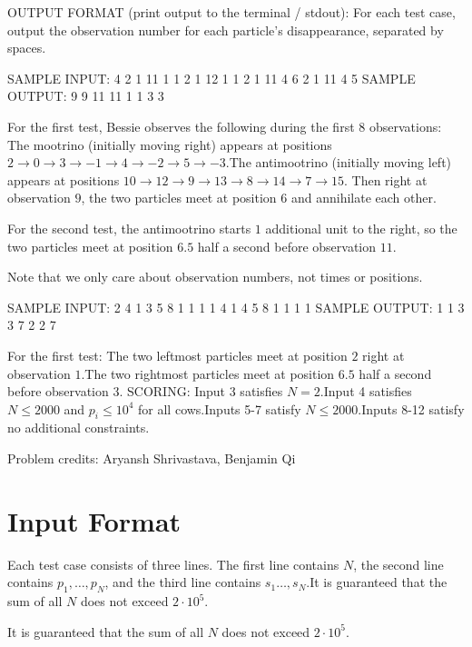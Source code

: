 \documentclass[12pt]{article}
\begin{document}
OUTPUT FORMAT (print output to the terminal / stdout):
For each test case, output the observation number for each particle's
disappearance, separated by spaces.

SAMPLE INPUT:
4
2
1 11
1 1
2
1 12
1 1
2
1 11
4 6
2
1 11
4 5
SAMPLE OUTPUT: 
9 9
11 11
1 1
3 3

For the first test, Bessie observes the following during the first $8$
observations:
The mootrino (initially moving right) appears at positions
$2 \rightarrow 0 \rightarrow 3 \rightarrow -1 \rightarrow 4 \rightarrow -2 \rightarrow 5 \rightarrow -3$.The antimootrino (initially moving left) appears at positions
$10 \rightarrow 12 \rightarrow 9 \rightarrow 13 \rightarrow 8 \rightarrow 14 \rightarrow 7 \rightarrow 15$.
Then right at observation $9$, the two particles meet at position $6$ and
annihilate each other.

For the second test, the antimootrino starts $1$ additional unit to the right,
so the two particles meet at position $6.5$ half a second before observation
$11$.

Note that we only care about observation numbers, not times or positions.

SAMPLE INPUT:
2
4
1 3 5 8
1 1 1 1
4
1 4 5 8
1 1 1 1
SAMPLE OUTPUT: 
1 1 3 3
7 2 2 7

For the first test:
The two leftmost particles meet at position $2$ right at observation
$1$.The two rightmost particles meet at position $6.5$ half a second
before observation $3$.
SCORING:
Input 3 satisfies $N = 2$.Input 4 satisfies $N \leq 2000$ and $p_i \leq 10^4$ for all cows.Inputs 5-7 satisfy $N \leq 2000$.Inputs 8-12 satisfy no additional constraints.


Problem credits: Aryansh Shrivastava, Benjamin Qi



\section*{Input Format}
Each test case consists of three lines. The first line contains $N$, the second
line contains $p_1,\dots,p_N$, and the third line contains $s_1\dots,s_N$.It is guaranteed that the sum of all $N$ does not exceed $2\cdot 10^5$.

It is guaranteed that the sum of all $N$ does not exceed $2\cdot 10^5$.
\end{document}

